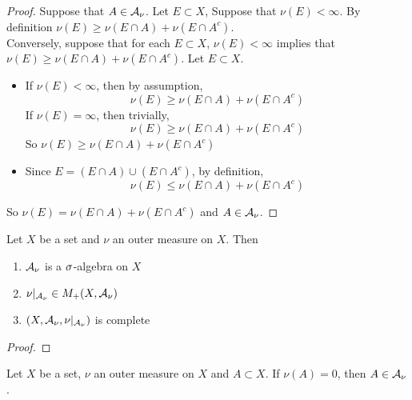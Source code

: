 \documentclass{book}
\begin{document}
	\begin{proof}
	Suppose that $A \in \mathcal{A}_{\nu}$. Let $E \subset X$, Suppose that $\nu(E) < \infty$. By definition $\nu(E) \geq \nu(E \cap A) + \nu(E \cap A^c)$. \\
	Conversely, suppose that for each $E \subset X$, $\nu(E) < \infty$ implies that $\nu(E) \geq \nu(E \cap A) + \nu(E \cap A^c)$. Let $E \subset X$. 
	\begin{itemize}
	\item If $\nu(E) < \infty$, then by assumption, 
	\begin{equation*}
	\nu(E) \geq \nu(E \cap A) + \nu(E \cap A^c)
	\end{equation*}		
	If $\nu(E) = \infty$, then trivially, 
	\begin{equation*}
	\nu(E) \geq \nu(E \cap A) + \nu(E \cap A^c)
	\end{equation*}	 
	So $\nu(E) \geq \nu(E \cap A) + \nu(E \cap A^c)$
	\item Since $E = (E \cap A) \cup (E \cap A^c)$, by definition, 
	\begin{equation*}
	\nu(E) \leq \nu(E \cap A) + \nu(E \cap A^c)
	\end{equation*}	
	\end{itemize}
	So $\nu(E) = \nu(E \cap A) + \nu(E \cap A^c)$ and $A \in \mathcal{A}_{\nu}$.
	\end{proof}





	
	\begin{ex}   
		Let $X$ be a set and $\nu$ an outer measure on $X$. Then  
		\begin{enumerate}
			\item $\mathcal{A}_{\nu}$ is a $\sigma$-algebra on $X$
			\item $\nu|_{\mathcal{A}_{\nu}} \in M_+(X, \mathcal{A}_{\nu})$
			\item $(X, \mathcal{A}_{\nu}, \nu|_{\mathcal{A}_{\nu}})$ is complete
		\end{enumerate}
	\end{ex}
	
	\begin{proof}
	\end{proof}

	\begin{ex}
		Let $X$ be a set, $\nu$ an outer measure on $X$ and $A \subset X$. If $\nu(A) = 0$, then $A \in \mathcal{A}_{\nu}$.
	\end{ex}
	
\end{document}
